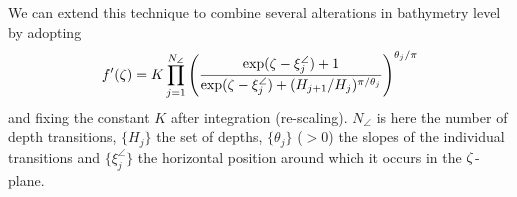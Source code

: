 \documentclass[internal]{sintefmemo}
\begin{document}
We can extend this technique to combine several alterations in bathymetry level by adopting
\begin{equation}
f'(\zeta) = K \prod_{j=1}^{N_\angle} \left(\frac{\exp(\zeta-\xi^\angle_j)+1}{\exp(\zeta-\xi^\angle_j) + (H_{j+1}/H_j)^{\pi/\theta_j}}\right)^{\theta_j/\pi}
\label{eq:SCnumMultiStep}
\end{equation}
and fixing the constant $K$ after integration (re-scaling). $N_\angle$ is here the number of depth transitions, $\{H_j\}$ the set of depths, $\{\theta_j\}$ ($>0$) the slopes of the individual transitions and $\{\xi^\angle_j\}$ the horizontal position around which it occurs in the $\zeta$-plane. 
%
%
%
\end{document}
